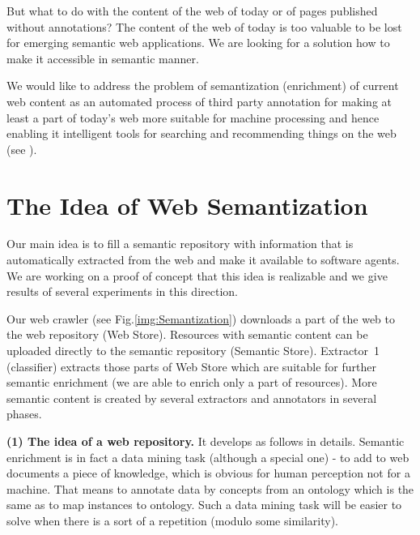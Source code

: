 \documentclass{www2009-submission}
\begin{document}
But what to do with the content of the web of today or of pages published without annotations? The content of the web of today is too valuable to be lost for emerging semantic web applications. We are looking for a solution how to make it accessible in semantic manner. \par

We would like to address the problem of semantization (enrichment) of current web content as an automated process of third party annotation for making at least a part of today's web more suitable for machine processing and hence enabling it intelligent tools for searching and recommending things on the web (see \cite{biblio:LeeWebThings}). \par

\section{The Idea of Web Semantization}
Our main idea is to fill a semantic repository with information that is automatically extracted from the web and make it available to software agents. We are working on a proof of concept that this idea is realizable and we give results of several experiments in this direction.

Our web crawler (see Fig.\ref{img:Semantization}) downloads a part of the web to the web repository (Web Store). Resources with semantic content can be uploaded directly to the semantic repository (Semantic Store). Extractor~1 (classifier) extracts those parts of Web Store which are suitable for further semantic enrichment (we are able to enrich only a part of resources). More semantic content is created by several extractors and annotators in several phases. %



\textbf{(1) The idea of a web repository.} It develops as follows in details. Semantic enrichment is in fact a data mining task (although a special one) - to add to web documents a piece of knowledge, which is obvious for human perception not for a machine. That means to annotate data by concepts from an ontology which is the same as to map instances to ontology. Such a data mining task will be easier to solve when there is a sort of a repetition (modulo some similarity).\par 

\end{document}
